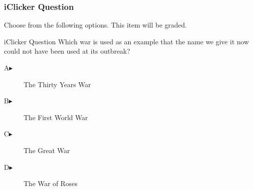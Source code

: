 \begin{frame}
  \frametitle{iClicker Question}
Choose from the following options. This item will be graded.
\begin{block}{iClicker Question}
Which war is used as an example that the name we give it now could
not have been used at its outbreak?
\end{block}
\begin{description}
\item[A\hspace{.2in}$\blacktriangleright$] The Thirty Years War
\item[B\hspace{.2in}$\blacktriangleright$] The First World War
\item[C\hspace{.2in}$\blacktriangleright$] The Great War
\item[D\hspace{.2in}$\blacktriangleright$] The War of Roses
\end{description}
\end{frame}
